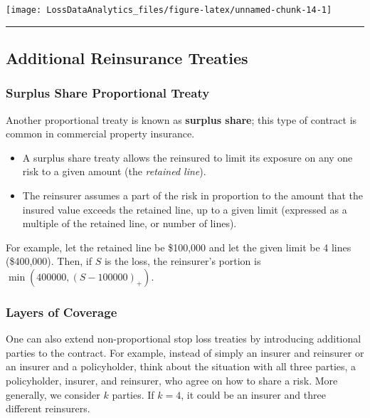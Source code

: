 \documentclass[]{book}
\providecommand{\tightlist}{%
  \setlength{\itemsep}{0pt}\setlength{\parskip}{0pt}}
\theoremstyle{definition}
\theoremstyle{definition}
\theoremstyle{definition}
\theoremstyle{remark}
\begin{document}
\begin{center}\texttt{[image: LossDataAnalytics\_files/figure-latex/unnamed-chunk-14-1]} \end{center}

\begin{center}\rule{0.5\linewidth}{\linethickness}\end{center}

\subsection{Additional Reinsurance Treaties}\label{S:AdditionalRe}

\subsubsection{Surplus Share Proportional
Treaty}\label{surplus-share-proportional-treaty}

Another proportional treaty is known as \textbf{surplus share}; this
type of contract is common in commercial property insurance.

\begin{itemize}
\tightlist
\item
  A surplus share treaty allows the reinsured to limit its exposure on
  any one risk to a given amount (the \emph{retained line}).
\item
  The reinsurer assumes a part of the risk in proportion to the amount
  that the insured value exceeds the retained line, up to a given limit
  (expressed as a multiple of the retained line, or number of lines).
\end{itemize}

For example, let the retained line be \$100,000 and let the given limit
be 4 lines (\$400,000). Then, if \(S\) is the loss, the reinsurer's
portion is \(\min(400000, (S-100000)_+)\).

\subsubsection{Layers of Coverage}\label{layers-of-coverage}

One can also extend non-proportional stop loss treaties by introducing
additional parties to the contract. For example, instead of simply an
insurer and reinsurer or an insurer and a policyholder, think about the
situation with all three parties, a policyholder, insurer, and
reinsurer, who agree on how to share a risk. More generally, we consider
\(k\) parties. If \(k=4\), it could be an insurer and three different
reinsurers.
\end{document}

